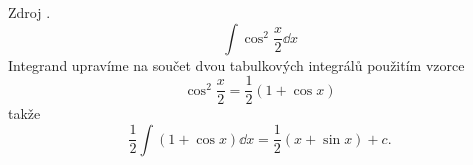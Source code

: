 \begin{mdframed}[style=mdexam]
  \begin{example}\label{MAI:exam132}
    Zdroj \cite[s.~30]{Knichal}.
    \begin{equation}\label{MA:int_ex_05}
      \int\cos^2\frac{x}{2}\dd{x}
    \end{equation}
    Integrand upravíme na součet dvou tabulkových integrálů použitím vzorce
    \begin{equation*}
      \cos^2\frac{x}{2} = \frac{1}{2}(1+\cos x) 
    \end{equation*}
    takže
    \begin{equation*}
      \frac{1}{2}\int{(1+\cos x)}\dd{x} = \frac{1}{2}(x+\sin x) + c.
    \end{equation*}
  \end{example}
\end{mdframed}